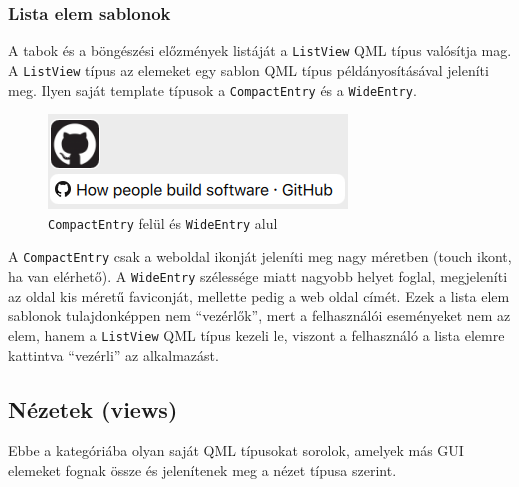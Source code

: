 \documentclass[12pt]{report}
\begin{document}
\subsubsection{Lista elem sablonok}
\label{sec:list-entry-templates}
A tabok és a böngészési előzmények listáját a \texttt{ListView} QML típus valósítja mag.
A \texttt{ListView} típus az elemeket egy sablon QML típus példányosításával
jeleníti meg. Ilyen saját template típusok a \texttt{CompactEntry} és a \texttt{WideEntry}.
\begin{figure}[H]
    \centering
    \includegraphics[scale=0.8]{Compact-Wide-Entries}
    \caption{
        \label{fig:compact-wide-entries}
        \texttt{CompactEntry} felül és \texttt{WideEntry} alul
    }
\end{figure}
A \texttt{CompactEntry} csak a weboldal ikonját jeleníti meg nagy méretben (touch ikont, ha
van elérhető). A \texttt{WideEntry} szélessége miatt nagyobb helyet foglal, megjeleníti az
oldal kis méretű faviconját, mellette pedig a web oldal címét. Ezek a lista elem sablonok
tulajdonképpen nem ``vezérlők'', mert a felhasználói eseményeket nem az elem, hanem a
\texttt{ListView} QML típus kezeli le, viszont a felhasználó a lista elemre kattintva
``vezérli'' az alkalmazást.

\subsection{Nézetek (views)}
Ebbe a kategóriába olyan saját QML típusokat sorolok, amelyek más GUI elemeket fognak össze
és jelenítenek meg a nézet típusa szerint.
\end{document}
